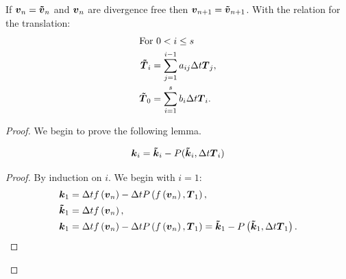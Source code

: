 \begin{theorem}
If ${\boldsymbol {v}}_{n}={\boldsymbol {\tilde{v}}}_{n}$ and ${\boldsymbol {v}}_n$ are divergence free then ${\boldsymbol {v}}_{n+1}={\boldsymbol {\tilde{v}}}_{n+1}$.
With the relation for the translation:
\begin{align}
\intertext{For $0< i\leq s$}
  {\boldsymbol {\tilde{T}}}_i&=\sum_{j=1}^{i-1}a_{ij}\Delta t {\boldsymbol {T}}_{j},\\
  {\boldsymbol {\tilde{T}}}_0&=\sum_{i=1}^{s}b_{i}\Delta t {\boldsymbol {T}}_{i}.
\end{align}

\end{theorem}
\begin{proof}
We begin to prove the following lemma.
\begin{lemma}
\begin{equation}
  {\boldsymbol {k}}_{i}={\boldsymbol {\tilde{k}}}_{i}-P({\boldsymbol {\tilde{k}}}_{i},\Delta t {\boldsymbol {T}}_{i})
\end{equation}
\end{lemma}
\begin{proof}
By induction on $i$.
We begin with $i=1$:
\begin{align}
  {\boldsymbol {k}}_{1}&=\Delta tf\left({\boldsymbol {v}}_n\right)-\Delta tP\left(f\left({\boldsymbol {v}}_n\right),{\boldsymbol {T}}_{1}\right),\\
{\boldsymbol {\tilde{k}}}_{1}&=\Delta tf\left({\boldsymbol {{\boldsymbol {v}}}}_n\right),\\
  {\boldsymbol {k}}_{1}&=\Delta t f\left({\boldsymbol {v}}_n\right)-\Delta tP\left(f\left({\boldsymbol {v}}_n\right),{\boldsymbol {T}}_{1}\right)={\boldsymbol {\tilde{k}}}_1-P\left({\boldsymbol {\tilde{k}}}_1,\Delta t {\boldsymbol {T}}_{1}\right).
\end{align}


\end{proof}
\end{proof}
